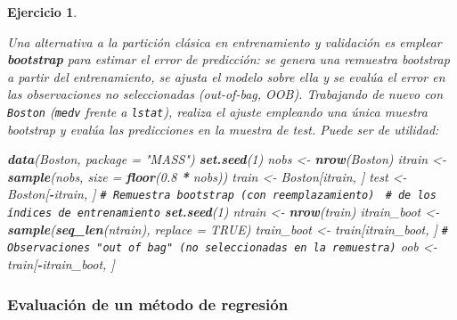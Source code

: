 \documentclass[
]{book}
\newenvironment{Shaded}{\begin{snugshade}}{\end{snugshade}}
\newcommand{\AttributeTok}[1]{\textcolor[rgb]{0.13,0.29,0.53}{#1}}
\newcommand{\CommentTok}[1]{\textcolor[rgb]{0.56,0.35,0.01}{\textit{#1}}}
\newcommand{\ConstantTok}[1]{\textcolor[rgb]{0.56,0.35,0.01}{#1}}
\newcommand{\DecValTok}[1]{\textcolor[rgb]{0.00,0.00,0.81}{#1}}
\newcommand{\FloatTok}[1]{\textcolor[rgb]{0.00,0.00,0.81}{#1}}
\newcommand{\FunctionTok}[1]{\textcolor[rgb]{0.13,0.29,0.53}{\textbf{#1}}}
\newcommand{\NormalTok}[1]{#1}
\newcommand{\OtherTok}[1]{\textcolor[rgb]{0.56,0.35,0.01}{#1}}
\newcommand{\SpecialCharTok}[1]{\textcolor[rgb]{0.81,0.36,0.00}{\textbf{#1}}}
\newcommand{\StringTok}[1]{\textcolor[rgb]{0.31,0.60,0.02}{#1}}
\theoremstyle{break}
\newtheorem{exercise}{Ejercicio}[chapter]
\theoremstyle{nonumberplain}
\renewcommand{\CommentTok}[1]{\textcolor[rgb]{0.41,0.41,0.41}{\texttt{#1}}}
\begin{document}
\begin{exercise}
\protect\hypertarget{exr:train-boot-boston}{}\label{exr:train-boot-boston}

Una alternativa a la partición clásica en entrenamiento y validación es emplear \textbf{bootstrap} para estimar el error de predicción: se genera una remuestra bootstrap a partir del entrenamiento, se ajusta el modelo sobre ella y se evalúa el error en las observaciones no seleccionadas (\emph{out-of-bag}, OOB). Trabajando de nuevo con \texttt{Boston} (\texttt{medv} frente a \texttt{lstat}), realiza el ajuste empleando una única muestra bootstrap y evalúa las predicciones en la muestra de test. Puede ser de utilidad:

\begin{Shaded}
\begin{Highlighting}[]
\FunctionTok{data}\NormalTok{(Boston, }\AttributeTok{package =} \StringTok{"MASS"}\NormalTok{)}
\FunctionTok{set.seed}\NormalTok{(}\DecValTok{1}\NormalTok{)}
\NormalTok{nobs }\OtherTok{\textless{}{-}} \FunctionTok{nrow}\NormalTok{(Boston)}
\NormalTok{itrain }\OtherTok{\textless{}{-}} \FunctionTok{sample}\NormalTok{(nobs, }\AttributeTok{size =} \FunctionTok{floor}\NormalTok{(}\FloatTok{0.8} \SpecialCharTok{*}\NormalTok{ nobs))}
\NormalTok{train }\OtherTok{\textless{}{-}}\NormalTok{ Boston[itrain, ]}
\NormalTok{test  }\OtherTok{\textless{}{-}}\NormalTok{ Boston[}\SpecialCharTok{{-}}\NormalTok{itrain, ]}
\CommentTok{\# Remuestra bootstrap (con reemplazamiento) }
\CommentTok{\# de los índices de entrenamiento}
\FunctionTok{set.seed}\NormalTok{(}\DecValTok{1}\NormalTok{)}
\NormalTok{ntrain }\OtherTok{\textless{}{-}} \FunctionTok{nrow}\NormalTok{(train)}
\NormalTok{itrain\_boot }\OtherTok{\textless{}{-}} \FunctionTok{sample}\NormalTok{(}\FunctionTok{seq\_len}\NormalTok{(ntrain), }\AttributeTok{replace =} \ConstantTok{TRUE}\NormalTok{)}
\NormalTok{train\_boot }\OtherTok{\textless{}{-}}\NormalTok{ train[itrain\_boot, ]}
\CommentTok{\# Observaciones "out of bag" (no seleccionadas en la remuestra)}
\NormalTok{oob }\OtherTok{\textless{}{-}}\NormalTok{ train[}\SpecialCharTok{{-}}\NormalTok{itrain\_boot, ]}
\end{Highlighting}
\end{Shaded}

\end{exercise}

\subsubsection{Evaluación de un método de regresión}\label{eval-reg}
\end{document}
